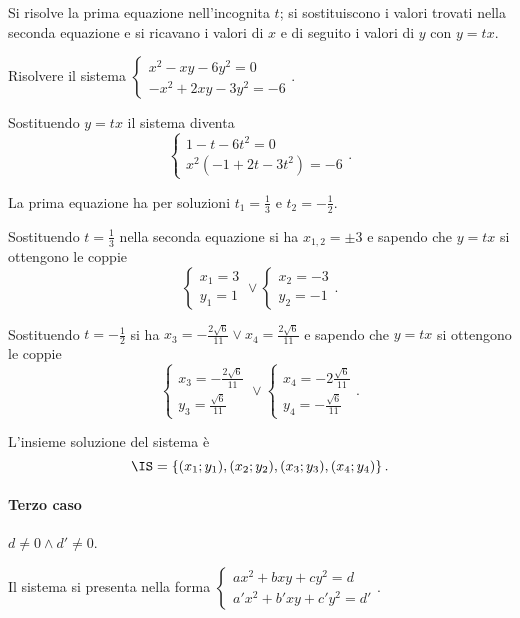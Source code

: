 Si risolve la prima equazione nell'incognita $t$; si sostituiscono i valori trovati nella seconda equazione e si ricavano i valori di $x$ e di seguito i valori di $y$ con $y={tx}$.
\newpage
\begin{exrig}
\begin{esempio}
Risolvere il sistema $\left\{\begin{array}{l}x^2-{xy}-6y^2=0 \\-x^2+2{xy}-3y^2=-6 \end{array}\right.$.

Sostituendo $y={tx}$ il sistema diventa 
\[\left\{\begin{array}{l}1-t-6t^2=0 \\x^2(-1+2t-3t^2)=-6 \end{array}\right..\]

La prima equazione ha per soluzioni $t_1=\frac 1 3$ e $t_2=-\frac 1 2$.

Sostituendo $t=\frac 1 3$ nella seconda equazione si ha $x_{1,2}=\pm 3$ e sapendo che $y={tx}$ si ottengono le coppie 
\[\left\{\begin{array}{l}x_1=3\\y_1=1\end{array}\right.\vee\left\{\begin{array}{l}x_2=-3\\y_2=-1\end{array}\right..\]

Sostituendo $t=-\frac 1 2$ si ha $x_3=-\frac{2\sqrt 6}{11}\vee x_4=\frac{2\sqrt 6}{11}$ e sapendo che $y={tx}$ si ottengono le coppie 
\[\left\{\begin{array}{l}x_3=-\frac{2\sqrt 6}{11}\\y_3=\frac{\sqrt 6}{11}\end{array}\right.\vee\left\{\begin{array}{l}x_4=-2\frac{\sqrt 6}{11}\\y_4=-\frac{\sqrt 6}{11}\end{array}\right..\]

L'insieme soluzione del sistema è 
\[\IS=\left\{(x_1;y_1),(x_2;y_2),(x_3;y_3),(x_4;y_4)\right\}.\]
\end{esempio}
\end{exrig}

\paragraph{Terzo caso} $d\neq 0 \wedge d'\neq 0$.

Il sistema si presenta nella forma $\left\{\begin{array}{l}{{ax}^2+{bxy}+{cy}^2=d}\\{a'x^2+b'{xy}+c'y^2=d'}\end{array}\right.$.

